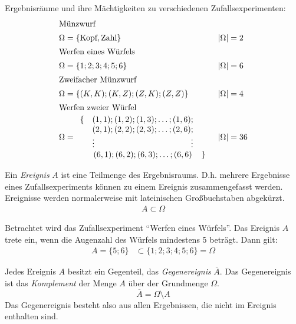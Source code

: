 \begin{bsp}[Ergebnisraum]
Ergebnisräume und ihre Mächtigkeiten zu verschiedenen Zufallsexperimenten:
\begin{align*}
 \intertext{Münzwurf}
 \Omega &= \lbrace \text{Kopf}, \text{Zahl} \rbrace & |\Omega| &= 2\\
 \intertext{Werfen eines Würfels}
 \Omega &= \lbrace 1; 2; 3; 4; 5; 6 \rbrace & |\Omega| &= 6\\
 \intertext{Zweifacher Münzwurf}
 \Omega &= \left\lbrace (K,K);(K,Z);(Z,K);(Z,Z)\right\rbrace & |\Omega| &= 4 \\
 \intertext{Werfen zweier Würfel}
 \Omega &= \begin{array}{rcl}
            \lbrace & (1,1);(1,2);(1,3); \ldots ;(1,6); & \\
            & (2,1);(2,2);(2,3); \ldots ;(2,6); & \\
            & \vdots \hfill \vdots & \\
            & (6,1);(6,2);(6,3); \ldots ;(6,6) & \rbrace
           \end{array} & |\Omega| &= 36
\end{align*}
\end{bsp}

\begin{defi}[Ereignis]
Ein \emph{Ereignis} \(A\) ist eine Teilmenge des Ergebnisraums. D.h. mehrere Ergebnisse eines Zufallsexperiments können zu einem Ereignis zusammengefasst werden. Ereignisse werden normalerweise mit lateinischen Großbuchstaben abgekürzt.
\begin{align*}
 A \subset \Omega
\end{align*}
\end{defi}

\begin{bsp}[Ereignis]
 Betrachtet wird das Zufallsexperiment "`Werfen eines Würfels"'. Das Ereignis \(A\) trete ein, wenn die Augenzahl des Würfels mindestens 5 beträgt. Dann gilt:
 \begin{align*}
  A = \lbrace 5;6\rbrace &\subset \lbrace
  1;2;3;4;5;6\rbrace = \Omega
 \end{align*}
\end{bsp}

\begin{defi}[Gegenereignis]
 Jedes Ereignis \(A\) besitzt ein Gegenteil, das \emph{Gegenereignis} \(\overline{A}\). Das Gegenereignis ist das \emph{Komplement} der Menge \(A\) über der Grundmenge \(\Omega\).
 \begin{equation*}
  \overline{A} = \Omega \setminus A
 \end{equation*}
 Das Gegenereignis besteht also aus allen Ergebnissen, die nicht im Ereignis enthalten sind.
\end{defi}

